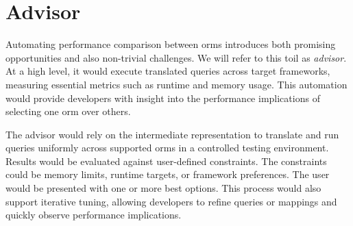 \section{Advisor}
Automating performance comparison between \acrshort{orm}s introduces both promising opportunities and also non-trivial challenges. We will refer to this toil as \emph{advisor}. At a high level, it would execute translated queries across target frameworks, measuring essential metrics such as runtime and memory usage. This automation would provide developers with insight into the performance implications of selecting one \acrshort{orm} over others. 

The advisor would rely on the intermediate representation to translate and run queries uniformly across supported \acrshort{orm}s in a controlled testing environment. Results would be evaluated against user-defined constraints. The constraints could be memory limits, runtime targets, or framework preferences. The user would be presented with one or more best options. This process would also support iterative tuning, allowing developers to refine queries or mappings and quickly observe performance implications.